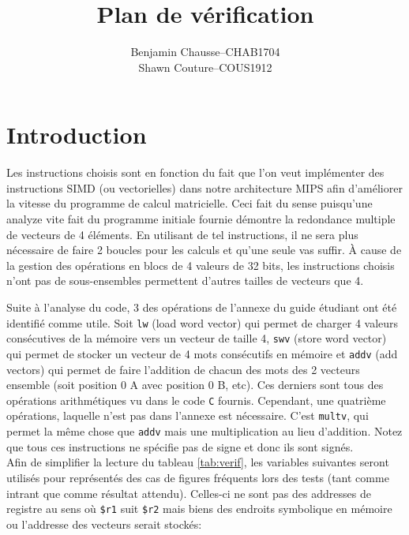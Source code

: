 \documentclass[a11paper]{article}
\title{Plan de vérification}
\author{
  \addtolength{\tabcolsep}{-0.4em}
  \begin{tabular}{rcl} %
      Benjamin Chausse & -- & CHAB1704 \\
      Shawn Couture    & -- & COUS1912 \\
  \end{tabular}
}
\begin{document}
\maketitle
\newpage

\section{Introduction}
Les instructions choisis sont en fonction du fait que l'on veut implémenter des instructions SIMD (ou vectorielles) dans notre architecture MIPS afin d'améliorer
la vitesse du programme de calcul matricielle. Ceci fait du sense puisqu'une analyze vite fait du programme initiale fournie démontre la redondance multiple de vecteurs de 4 éléments.
En utilisant de tel instructions, il ne sera plus nécessaire de faire 2 boucles pour les calculs et qu'une seule vas suffir. À cause de la gestion des opérations en blocs de 4 valeurs de 32 bits, les instructions choisis n'ont pas de sous-ensembles permettent d'autres tailles de vecteurs que 4.

Suite à l'analyse du code, 3 des opérations de l'annexe du guide étudiant ont été identifié comme utile. Soit \verb|lw| (load word vector) qui permet de charger 4 valeurs consécutives de la mémoire vers un vecteur de taille 4, \verb|swv| (store word vector) qui permet de stocker un vecteur de 4 mots consécutifs en mémoire et \verb|addv| (add vectors) qui permet de faire l'addition de chacun des mots des 2 vecteurs ensemble (soit position 0 A avec position 0 B, etc). Ces derniers sont tous des opérations arithmétiques vu dans le code \verb|C| fournis. Cependant, une quatrième opérations, laquelle n'est pas dans l'annexe est nécessaire. C'est \verb|multv|, qui permet la même chose que \verb|addv| mais une multiplication au lieu d'addition. Notez que tous ces instructions ne spécifie pas de signe et donc ils sont signés. \\


Afin de simplifier la lecture du tableau \ref{tab:verif}, les variables
suivantes seront utilisés pour représentés des cas de figures fréquents lors
des tests (tant comme intrant que comme résultat attendu). Celles-ci ne sont
pas des addresses de registre au sens où \verb|$r1| suit \verb|$r2| mais biens
des endroits symbolique en mémoire ou l'addresse des vecteurs serait stockés:
\end{document}
